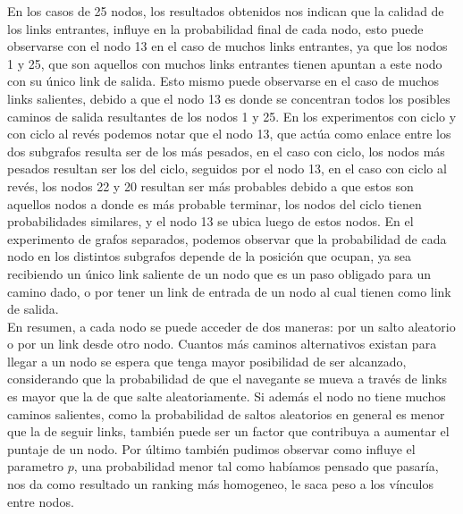 En los casos de 25 nodos, los resultados obtenidos nos indican que la calidad de los links entrantes, influye en la probabilidad final de cada nodo, esto puede observarse con el nodo 13 en el caso de muchos links entrantes, ya que los nodos 1 y 25, que son aquellos con muchos links entrantes tienen apuntan a este nodo con su \'unico link de salida. Esto mismo puede observarse en el caso de muchos links salientes, debido a que el nodo 13 es donde se concentran todos los posibles caminos de salida resultantes de los nodos 1 y 25.
En los experimentos con ciclo y con ciclo al rev\'es podemos notar que el nodo 13, que act\'ua como enlace entre los dos subgrafos resulta ser de los m\'as pesados, en el caso con ciclo, los nodos m\'as pesados resultan ser los del ciclo, seguidos por el nodo 13, en el caso con ciclo al rev\'es, los nodos 22 y 20 resultan ser m\'as probables debido a que estos son aquellos nodos a donde es m\'as probable terminar, los nodos del ciclo tienen probabilidades similares, y el nodo 13 se ubica luego de estos nodos.
En el experimento de grafos separados, podemos observar que la probabilidad de cada nodo en los distintos subgrafos depende de la posici\'on que ocupan, ya sea recibiendo un \'unico link saliente de un nodo que es un paso obligado para un camino dado, o por tener un link de entrada de un nodo al cual tienen como link de salida.\\

En resumen, a cada nodo se puede acceder de dos maneras: por un salto aleatorio o por un link desde otro nodo. Cuantos más caminos alternativos existan para llegar a un nodo se espera que tenga mayor posibilidad de ser alcanzado, considerando que la probabilidad de que el navegante se mueva a través de links es mayor que la de que salte aleatoriamente. Si además el nodo no tiene muchos caminos salientes, como la probabilidad de saltos aleatorios en general es menor que la de seguir links, también puede ser un factor que contribuya a aumentar el puntaje de un nodo.
Por \'ultimo tambi\'en pudimos observar como influye el parametro $p$, una probabilidad menor tal como hab\'iamos pensado que pasar\'ia, nos da como resultado un ranking m\'as homogeneo, le saca peso a los v\'inculos entre nodos.